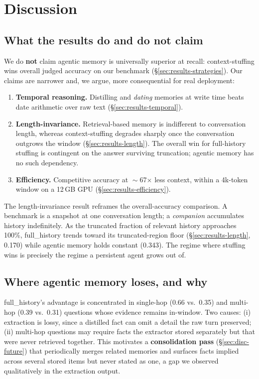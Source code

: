 \section{Discussion}
\label{sec:discussion}

\subsection{What the results do and do not claim}
\label{sec:disc-claims}

We do \textbf{not} claim agentic memory is universally superior at recall:
context-stuffing wins overall judged accuracy on our benchmark
(\S\ref{sec:results-strategies}). Our claims are narrower and, we argue, more
consequential for real deployment:

\begin{enumerate}
  \item \textbf{Temporal reasoning.} Distilling and \emph{dating} memories at write time beats
  date arithmetic over raw text (\S\ref{sec:results-temporal}).
  \item \textbf{Length-invariance.} Retrieval-based memory is indifferent to conversation
  length, whereas context-stuffing degrades sharply once the conversation
  outgrows the window (\S\ref{sec:results-length}). The overall win for
  full-history stuffing is contingent on the answer surviving truncation;
  agentic memory has no such dependency.
  \item \textbf{Efficiency.} Competitive accuracy at $\sim$67$\times$ less context, within a
  4k-token window on a 12\,GB GPU (\S\ref{sec:results-efficiency}).
\end{enumerate}

The length-invariance result reframes the overall-accuracy comparison. A
benchmark is a snapshot at one conversation length; a \emph{companion} accumulates
history indefinitely. As the truncated fraction of relevant history approaches
100\%, full\_history trends toward its truncated-region floor
(\S\ref{sec:results-length}, 0.170) while agentic memory holds constant (0.343).
The regime where stuffing wins is precisely the regime a persistent agent grows
out of.

\subsection{Where agentic memory loses, and why}
\label{sec:disc-losses}

full\_history's advantage is concentrated in single-hop (0.66 vs.\ 0.35) and
multi-hop (0.39 vs.\ 0.31) questions whose evidence remains in-window. Two causes:
(i) extraction is lossy, since a distilled fact can omit a detail the raw turn
preserved; (ii) multi-hop questions may require facts the extractor stored
separately but that were never retrieved together. This motivates a
\textbf{consolidation pass} (\S\ref{sec:disc-future}) that periodically merges related
memories and surfaces facts implied across several stored items but never stated
as one, a gap we observed qualitatively in the extraction output.

